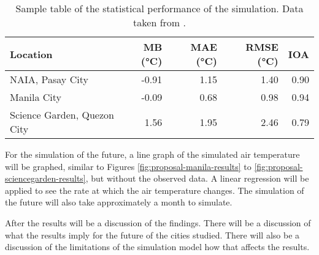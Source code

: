 	\begin{table}[]
		\caption{
			Sample table of the statistical performance of the simulation.
			Data taken from \textcite{Bilang2022}.
		}
		\label{tab:sample-statistical-performance}
		\centering
		\begin{tabular}{lrrrr}
			\hline \hline
			Location                    & MB (\unit{\degreeCelsius})    & MAE (\unit{\degreeCelsius}) & RMSE (\unit{\degreeCelsius}) & IOA \\
			\hline
			NAIA, Pasay City            & -0.91 & 1.15 & 1.40 & 0.90 \\
			Manila City                 & -0.09 & 0.68 & 0.98 & 0.94 \\
			Science Garden, Quezon City & 1.56  & 1.95 & 2.46 & 0.79 \\
			\hline
		\end{tabular}
	\end{table}

	For the simulation of the future,
	a line graph of the simulated air temperature will be graphed, similar to Figures \ref{fig:proposal-manila-results} to \ref{fig:proposal-sciencegarden-results}, but without the observed data.
	A linear regression will be applied to see the rate at which the air temperature changes.
	The simulation of the future will also take approximately a month to simulate.
	
 	After the results will be a discussion of the findings.
	There will be a discussion of what the results imply for the future of the cities studied.
	There will also be a discussion of the limitations of the simulation model how that affects the results.
